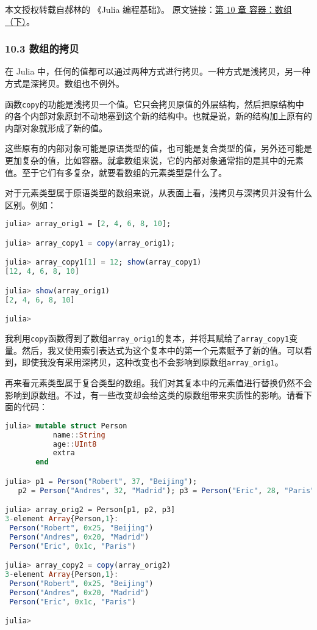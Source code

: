 
本文授权转载自郝林的 《Julia 编程基础》。 原文链接：\href{https://github.com/hyper0x/JuliaBasics/blob/master/book/ch10.md}{第 10 章 容器：数组（下）}。


\subsubsection{10.3 数组的拷贝}

在 Julia 中，任何的值都可以通过两种方式进行拷贝。一种方式是浅拷贝，另一种方式是深拷贝。数组也不例外。

函数\verb|copy|的功能是浅拷贝一个值。它只会拷贝原值的外层结构，然后把原结构中的各个内部对象原封不动地塞到这个新的结构中。也就是说，新的结构加上原有的内部对象就形成了新的值。

这些原有的内部对象可能是原语类型的值，也可能是复合类型的值，另外还可能是更加复杂的值，比如容器。就拿数组来说，它的内部对象通常指的是其中的元素值。至于它们有多复杂，就要看数组的元素类型是什么了。

对于元素类型属于原语类型的数组来说，从表面上看，浅拷贝与深拷贝并没有什么区别。例如：

\begin{lstlisting}[language=julia]
julia> array_orig1 = [2, 4, 6, 8, 10];

julia> array_copy1 = copy(array_orig1);

julia> array_copy1[1] = 12; show(array_copy1)
[12, 4, 6, 8, 10]

julia> show(array_orig1)
[2, 4, 6, 8, 10]

julia> 
\end{lstlisting}

我利用\verb|copy|函数得到了数组\verb|array_orig1|的复本，并将其赋给了\verb|array_copy1|变量。然后，我又使用索引表达式为这个复本中的第一个元素赋予了新的值。可以看到，即使我没有采用深拷贝，这种改变也不会影响到原数组\verb|array_orig1|。

再来看元素类型属于复合类型的数组。我们对其复本中的元素值进行替换仍然不会影响到原数组。不过，有一些改变却会给这类的原数组带来实质性的影响。请看下面的代码：

\begin{lstlisting}[language=julia]
julia> mutable struct Person
           name::String
           age::UInt8
           extra
       end

julia> p1 = Person("Robert", 37, "Beijing");
   p2 = Person("Andres", 32, "Madrid"); p3 = Person("Eric", 28, "Paris");

julia> array_orig2 = Person[p1, p2, p3]
3-element Array{Person,1}:
 Person("Robert", 0x25, "Beijing")
 Person("Andres", 0x20, "Madrid") 
 Person("Eric", 0x1c, "Paris")    

julia> array_copy2 = copy(array_orig2)
3-element Array{Person,1}:
 Person("Robert", 0x25, "Beijing")
 Person("Andres", 0x20, "Madrid") 
 Person("Eric", 0x1c, "Paris")    

julia> 
\end{lstlisting}

